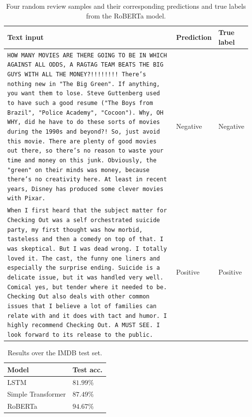 {\footnotesize
\begin{table}[ht]
\caption{Four random review samples and their corresponding predictions and true labels from the RoBERTa model.}
\centering
\begin{tabularx}{\textwidth}{Xll}
Text input & Prediction & True label \\
\hline
 {\scriptsize \texttt{HOW MANY MOVIES ARE THERE GOING TO BE IN WHICH
AGAINST ALL ODDS, A RAGTAG TEAM BEATS THE BIG GUYS
WITH ALL THE MONEY?!!!!!!!! There's nothing new in
"The Big Green". If anything, you want them to
lose. Steve Guttenberg used to have such a good
resume ("The Boys from Brazil", "Police Academy",
"Cocoon"). Why, OH WHY, did he have to do these
sorts of movies during the 1990s and beyond?! So,
just avoid this movie. There are plenty of good
movies out there, so there's no reason to waste
your time and money on this junk. Obviously, the
"green" on their minds was money, because there's
no creativity here. At least in recent years,
Disney has produced some clever movies with Pixar.} } &   Negative & Negative   \\
\hline
 {\scriptsize \texttt{When I first heard that the subject matter for
Checking Out was a self orchestrated suicide
party, my first thought was how morbid, tasteless
and then a comedy on top of that. I was skeptical.
But I was dead wrong. I totally loved it. The
cast, the funny one liners and especially the
surprise ending. Suicide is a delicate issue, but
it was handled very well. Comical yes, but tender
where it needed to be. Checking Out also deals
with other common issues that I believe a lot of
families can relate with and it does with tact and
humor. I highly recommend Checking Out. A MUST
SEE. I look forward to its release to the public.} } &   Positive & Positive   \\

\end{tabularx}
\label{tab:examples}
\end{table}
}

\begin{table}[h]
\caption{Results over the IMDB test set.}
\centering
\begin{tabular}{ll}
Model & Test acc. \\
\hline
LSTM &  $81.99\%$ \\
Simple Transformer &  $87.49\%$ \\
RoBERTa &  $94.67\%$\\
\end{tabular}
\label{tab:nlp}
\end{table}











